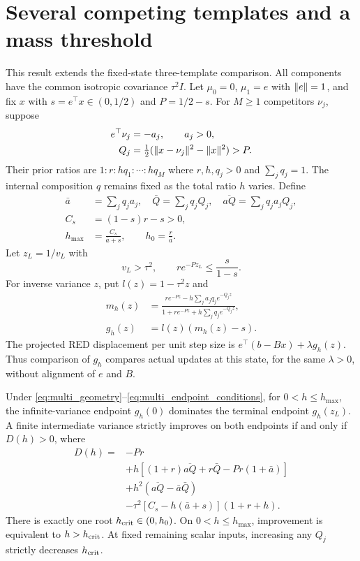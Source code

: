 \section{Several competing templates and a mass threshold}
\label{sec:multi_competitor}
This result extends the fixed-state three-template comparison.
All components have the common isotropic covariance $\tau^2I$.
Let $\mu_0=0$, $\mu_1=e$ with $\lVert e\rVert=1$, and fix $x$ with
$s=e^\top x\in(0,1/2)$ and $P=1/2-s$.
For $M\ge1$ competitors $\nu_j$, suppose
\begin{align}
 e^\top\nu_j&=-a_j,\qquad a_j>0,\nonumber\\
 Q_j&=\tfrac12(\lVert x-\nu_j\rVert^2-\lVert x\rVert^2)>P.
 \label{eq:multi_geometry}
\end{align}
Their prior ratios are $1:r:hq_1:\cdots:hq_M$ where
$r,h,q_j>0$ and $\sum_jq_j=1$.
The internal composition $q$ remains fixed as the total ratio $h$
varies. Define
\begin{align}
 \bar a&=\sum_jq_ja_j,\quad
 \bar Q=\sum_jq_jQ_j,\quad
 \overline{aQ}=\sum_jq_ja_jQ_j,\nonumber\\
 C_s&=(1-s)r-s>0,\nonumber\\
 h_{\max}&=\frac{C_s}{\bar a+s},\qquad h_0=\frac r{\bar a}.
 \label{eq:multi_mass_range}
\end{align}
Let $z_L=1/v_L$ with
\begin{equation}
 v_L>\tau^2,\qquad r e^{-Pz_L}\le \frac{s}{1-s}.
 \label{eq:multi_endpoint_conditions}
\end{equation}
For inverse variance $z$, put $l(z)=1-\tau^2z$ and
\begin{align}
 m_h(z)&=
 \frac{r e^{-Pz}-h\sum_j a_jq_je^{-Q_jz}}
      {1+r e^{-Pz}+h\sum_jq_je^{-Q_jz}},\nonumber\\
 g_h(z)&=l(z)(m_h(z)-s).
 \label{eq:multi_drift}
\end{align}
The projected RED displacement per unit step size is
$e^\top(b-Bx)+\lambda g_h(z)$.
Thus comparison of $g_h$ compares actual updates at this state,
for the same $\lambda>0$, without alignment of $e$ and $B$.

\begin{proposition}
\label{prop:multi_mass}
Under \eqref{eq:multi_geometry}--\eqref{eq:multi_endpoint_conditions},
for $0<h\le h_{\max}$, the infinite-variance endpoint
$g_h(0)$ dominates the terminal endpoint $g_h(z_L)$.
A finite intermediate variance strictly improves on both endpoints
if and only if $D(h)>0$, where
\begin{align}
 D(h)={}&-Pr\nonumber\\
 &+h[(1+r)\overline{aQ}+r\bar Q-Pr(1+\bar a)]\nonumber\\
 &+h^2(\overline{aQ}-\bar a\bar Q)\nonumber\\
 &-\tau^2[C_s-h(\bar a+s)](1+r+h).
 \label{eq:multi_polynomial}
\end{align}
There is exactly one root $h_{\rm crit}\in(0,h_0)$.
On $0<h\le h_{\max}$, improvement is equivalent to
$h>h_{\rm crit}$. At fixed remaining scalar inputs, increasing
any $Q_j$ strictly decreases $h_{\rm crit}$.
\end{proposition}

